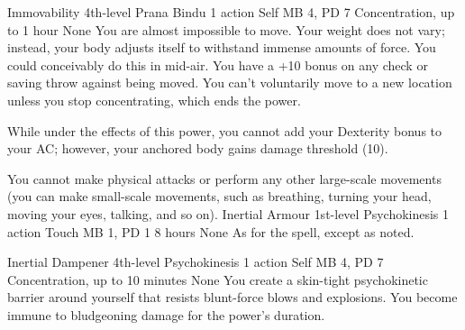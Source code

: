 \DndPowerHeader%
    {Immovability\label{pwr:immovability}}
    {4th-level Prana Bindu}
    {1 action}
    {Self}
    {MB 4, PD 7}
    {Concentration, up to 1 hour}
    {None}
You are almost impossible to move.
Your weight does not vary;
instead, your body adjusts itself to withstand immense amounts
of force. You could conceivably do this in mid-air. You have
a +10 bonus on any check or saving throw against being moved.
You can't voluntarily move to a new location unless you stop
concentrating, which ends the power.

While under the effects of this power, you cannot add your
Dexterity bonus to your AC; however, your anchored body gains
damage threshold (10).

You cannot make physical attacks or perform any other large-scale
movements (you can make small-scale movements, such as breathing,
turning your head, moving your eyes, talking, and so on).
\DndPowerHeader%
    {Inertial Armour\label{pwr:inertial_armour}}
    {1st-level Psychokinesis}
    {1 action}
    {Touch}
    {MB 1, PD 1}
    {8 hours}
    {None}
As for the  spell, except
as noted.

\DndPowerHeader%
    {Inertial Dampener\label{pwr:inertial_dampener}}
    {4th-level Psychokinesis}
    {1 action}
    {Self}
    {MB 4, PD 7}
    {Concentration, up to 10 minutes}
    {None}
You create a skin-tight psychokinetic barrier
around yourself that resists blunt-force blows and explosions.
You become immune to bludgeoning damage for the power's duration.

